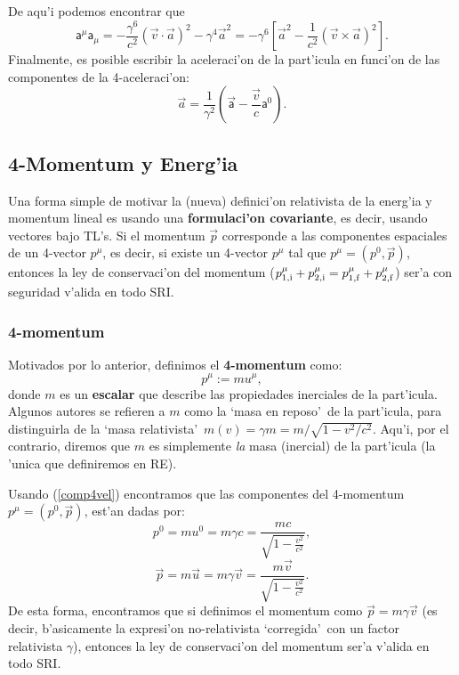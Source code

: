De aqu'i podemos encontrar que
\begin{equation}
 \mathsf{a}^\mu\mathsf{a}_\mu=-\frac{\gamma^6}{c^2}(\vec{v}\cdot\vec{a})^2-\gamma^4\vec{a}^2=-\gamma^6\left[\vec{a}^2-\frac{1}{c^2}(\vec{v}\times\vec{a})^2\right]. \label{4a2}
\end{equation}
Finalmente, es posible escribir la aceleraci'on de la part'icula en funci'on de
las componentes de la 4-aceleraci'on:
\begin{equation}
\vec{a}=\frac{1}{\gamma^2}\left(\vec{\mathsf{a}}-\frac{\vec{v}}{c}\mathsf{a}
^0\right).
\end{equation}


\subsection{4-Momentum y Energ'ia}

Una forma simple de motivar la (nueva) definici'on relativista de la energ'ia y momentum lineal es usando una \textbf{formulaci'on covariante}, es decir, usando vectores bajo TL's. Si el
momentum $\vec{p}$ corresponde a las componentes espaciales de un 4-vector
$p^\mu$, es decir, si existe un 4-vector $p^\mu$ tal que $p^\mu=(p^0,\vec{p})$, entonces la ley de conservaci'on del momentum
($p^\mu_{\rm 1,i}+p^\mu_{2,\rm i}=p^\mu_{1,\rm f}+p^\mu_{2,\rm f}$) ser'a con seguridad v'alida en
todo SRI.

\subsubsection{4-momentum}
Motivados por lo anterior, definimos el \textbf{4-momentum} como:
\begin{equation}
\boxed{p^\mu :=mu^\mu, \label{def4mom}}
\end{equation}
donde $m$ es un \textbf{escalar} que describe las propiedades inerciales de la
part'icula. Algunos autores se refieren a $m$ como la `masa en reposo'\ de la
part'icula, para distinguirla de la `masa relativista'\ $m(v)=\gamma
m={m}/{\sqrt{1-{v^2}/{c^2}}}$. Aqu'i, por el contrario, diremos que $m$
es simplemente \textit{la} masa (inercial) de la part'icula (la 'unica que
definiremos en RE).

Usando (\ref{comp4vel}) encontramos que las componentes del 4-momentum
$p^\mu=(p^0,\vec{p})$, est'an dadas por:
\begin{equation}
\boxed{p^0=m u^0=m\gamma c=\frac{mc}{\sqrt{1-\frac{v^2}{c^2}}}},
\end{equation}
\begin{equation}
\boxed{\vec{p}=m \vec{u}=m\gamma \vec{v}=\frac{m\vec{v}}{\sqrt{1-\frac{v^2}{c^2}}}.}
\end{equation}
De esta forma, encontramos que si definimos el momentum como
$\vec{p}=m\gamma\vec{v}$ (es decir, b'asicamente la expresi'on no-relativista
`corregida'\ con un factor relativista $\gamma$), entonces la ley de
conservaci'on del momentum ser'a v'alida en todo SRI.

